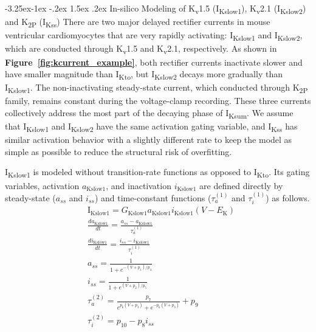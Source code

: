 \documentclass[11pt]{article}
\makeatletter
\renewcommand\subsubsection{\@startsection{subsubsection}{3}{\z@}%
                                    {-3.25ex\@plus -1ex \@minus -.2ex}%
                                     {1.5ex \@plus .2ex}%
                                     {\normalfont\normalsize\fontfamily{phv}\fontsize{14}{17}\selectfont}}
\makeatother
\begin{document}
\subsubsection{In-silico Modeling of K\textsubscript{v}1.5 (I\textsubscript{Kslow1}), K\textsubscript{v}2.1 (I\textsubscript{Kslow2}) and K\textsubscript{2P} (I\textsubscript{Kss})} \label{s:method.model2}
There are two major delayed rectifier currents in mouse ventricular cardiomyocytes that are very rapidly activating: I\textsubscript{Kslow1} and I\textsubscript{Kslow2}, which are conducted through K\textsubscript{v}1.5 and K\textsubscript{v}2.1, respectively. As shown in \textbf{Figure~\ref{fig:kcurrent_example}}, both rectifier currents inactivate slower and have smaller magnitude than I\textsubscript{Kto}, but I\textsubscript{Kslow2} decays more gradually than I\textsubscript{Kslow1}. The non-inactivating steady-state current, which conducted through K\textsubscript{2P} family, remains constant during the voltage-clamp recording. These three currents collectively address the most part of the decaying phase of I\textsubscript{Ksum}. We assume that I\textsubscript{Kslow1} and I\textsubscript{Kslow2} have the same activation gating variable, and I\textsubscript{Kss} has similar activation behavior with a slightly different rate to keep the model as simple as possible to reduce the structural risk of overfitting.

I\textsubscript{Kslow1} is modeled without transition-rate functions as opposed to I\textsubscript{Kto}. Its gating variables, activation $a_{\mathrm{Kslow1}}$, and inactivation $i_{\mathrm{Kslow1}}$ are defined directly by steady-state ($a_{ss}$ and $i_{ss}$) and time-constant functions ($\tau_{a}^{(1)}$ and $\tau_{i}^{(1)}$) as follows.
\begin{align}
    &\mathrm{I}_{\mathrm{Kslow1}} = G_{\mathrm{Kslow1}}a_{\mathrm{Kslow1}}i_{\mathrm{Kslow1}}(V-E_{\mathrm{K}}) \\
    &\frac{da_{\mathrm{Kslow1}}}{dt} = \frac{a_{ss}-a_{\mathrm{Kslow1}}}{\tau_{a}^{(1)}} \\
    &\frac{di_{\mathrm{Kslow1}}}{dt} = \frac{i_{ss}-i_{\mathrm{Kslow1}}}{\tau_{i}^{(1)}} \\
    &a_{ss} = \frac{1}{1+e^{-(V+p_{1})/p_{4}}} \label{eq:ass} \\
    &i_{ss} = \frac{1}{1+e^{(V+p_{2})/p_{5}}} \label{eq:iss} \\
    &\tau_{a}^{(2)} = \frac{p_{7}}{e^{p_{6}(V+p_{3})} + e^{-p_{6}(V+p_{3})}} + p_{9} \\
    &\tau_{i}^{(2)} = p_{10} - p_{8}i_{ss}
\end{align}
\end{document}
